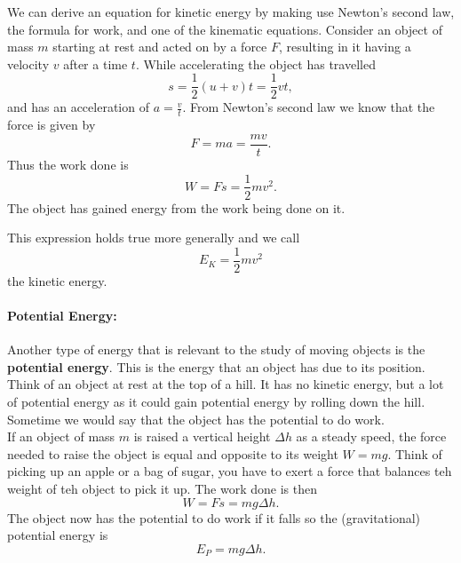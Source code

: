 We can derive an equation for kinetic energy by making use Newton's second law, the formula for work, and one of the kinematic equations. Consider an object of mass $m$ starting at rest and acted on by a force $F$, resulting in it having a velocity $v$ after a time $t$. While accelerating the object has travelled
\begin{equation*}
s=\frac{1}{2}\left(u+v\right)t=\frac{1}{2}vt,
\end{equation*}
and has an acceleration of $a=\frac{v}{t}$. From Newton's second law we know that the force is given by
\begin{equation*}
F=ma=\frac{mv}{t}.
\end{equation*}
Thus the work done is
\begin{equation*}
W=Fs=\frac{1}{2}mv^{2}.
\end{equation*}
The object has gained energy from the work being done on it.

This expression holds true more generally and we call 
\begin{equation}
E_{K}=\frac{1}{2}mv^{2}
\label{eq: kinetic energy}
\end{equation}
the kinetic energy.

%
\paragraph{Potential Energy:}  Another type of energy that is relevant to the study of moving objects is the \textbf{potential energy}. This is the energy that an object has due to its position. Think of an object at rest at the top of a hill. It has no kinetic energy, but a lot of potential energy as it could gain potential energy by rolling down the hill. Sometime we would say that the object has the potential to do work.\\

If an object of mass $m$ is raised a vertical height $\Delta h$ as a steady speed, the force needed to raise the object is equal and opposite to its weight $W=mg$. Think of picking up an apple or a bag of sugar, you have to exert a force that balances teh weight of teh object to pick it up. The work done is then
\begin{equation*}
W=Fs=mg\Delta h.
\end{equation*}
The object now has the potential to do work if it falls so the (gravitational) potential energy is 
\begin{equation}
E_{P}=mg\Delta h.
\label{eq: potential energy}
\end{equation}


